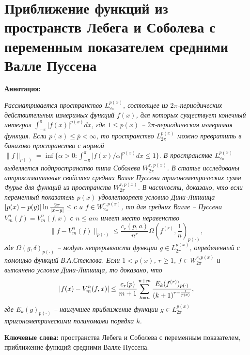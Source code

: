 \section{Приближение функций из пространств Лебега и Соболева с переменным показателем средними Валле Пуссена}


\begin{center}

\textbf{Аннотация:}

\textit{
Рассматривается  пространство $L^{p(x)}_{2\pi}$, состоящее из $2\pi$-периодических действительных измеримых функций $f(x)$, для которых
существует конечный интеграл $\int_{-\pi}^{\pi}|f(x)|^{p(x)}dx$, где $1\le p(x)$ -- $2\pi$-периодическая измеримая функция.  Если $ p(x)\le \overline p<\infty$, то пространство $L^{p(x)}_{2\pi}$ можно превратить в банахово пространство с нормой
$\|f\|_{p(\cdot)}=\inf\{\alpha>0:\int_{-\pi}^{\pi}|{f(x)/\alpha}|^{p(x)}dx\le1\}.$
В пространстве $L^{p(x)}_{2\pi}$ выделяется подпространство типа Соболева $W^{r,p(x)}_{2\pi}$. В статье исследованы аппроксимативные свойства
средних Валле Пуссена тригонометрических сумм Фурье для функций из пространств  $W^{r,p(x)}_{2\pi}$. В частности,
доказано, что если переменный показатель $p(x)$ удовлетворяет условию Дини-Липшица $|p(x)-p(y)|\ln{2\pi\over|x-y|}\le c$ и $f\in W^{r,p(x)}_{2\pi}$,
то для средних Валле -- Пуссена $V_m^n(f)=V_m^n(f,x)$ с $n\le am$  имеет место неравенство
 $$
 \|f-V_m^n(f)\|_{p(\cdot)}\le \frac{c_r(p,a)}{n^r}\Omega(f^{(r)},\frac1n)_{p(\cdot)},
 $$
 где $\Omega(g,\delta)_{p(\cdot)}$ -- модуль непрерывности функции $g\in L^{p(x)}_{2\pi}$, определенный с помощью функций В.А.Стеклова.
Если $1<p(x)$, $r\ge1$, $f\in W^{r,p(x)}_{2\pi}$ и выполнено условие Дини-Липшица, то доказано, что
$$
     |f(x)-V_m^n(f,x)|\le \frac{c_r(p)}{m+1}\sum_{k=n}^{n+m}{E_k(f^{(r)})_{p(\cdot)}\over (k+1)^{r-{\frac{1}{p(x)}}}},
$$
 где $E_k(g)_{p(\cdot)}$ -- наилучшее приближение функции $g\in L^{p(x)}_{2\pi}$ тригонометрическими полиномами порядка $k$.
 }
\end{center}


\begin{center}
\textbf{Ключевые слова:} пространства Лебега и Соболева с переменным показателем, приближение функций средними Валле-Пуссена.
\end{center}









